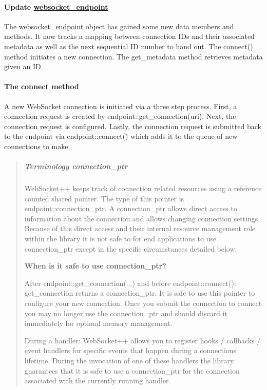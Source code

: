 \paragraph*{Update {\ttfamily \hyperlink{classwebsocket__endpoint}{websocket\+\_\+endpoint}}}

The {\ttfamily \hyperlink{classwebsocket__endpoint}{websocket\+\_\+endpoint}} object has gained some new data members and methods. It now tracks a mapping between connection I\+Ds and their associated metadata as well as the next sequential ID number to hand out. The {\ttfamily connect()} method initiates a new connection. The {\ttfamily get\+\_\+metadata} method retrieves metadata given an ID.

\paragraph*{The connect method}

A new Web\+Socket connection is initiated via a three step process. First, a connection request is created by {\ttfamily endpoint\+::get\+\_\+connection(uri)}. Next, the connection request is configured. Lastly, the connection request is submitted back to the endpoint via {\ttfamily endpoint\+::connect()} which adds it to the queue of new connections to make.

\begin{quote}
\subparagraph*{Terminology {\ttfamily connection\+\_\+ptr}}

Web\+Socket++ keeps track of connection related resources using a reference counted shared pointer. The type of this pointer is {\ttfamily endpoint\+::connection\+\_\+ptr}. A {\ttfamily connection\+\_\+ptr} allows direct access to information about the connection and allows changing connection settings. Because of this direct access and their internal resource management role within the library it is not safe to for end applications to use {\ttfamily connection\+\_\+ptr} except in the specific circumstances detailed below.

{\bfseries When is it safe to use {\ttfamily connection\+\_\+ptr}?}
\begin{DoxyItemize}
\item After {\ttfamily endpoint\+::get\+\_\+connection(...)} and before {\ttfamily endpoint\+::connect()}\+: {\ttfamily get\+\_\+connection} returns a {\ttfamily connection\+\_\+ptr}. It is safe to use this pointer to configure your new connection. Once you submit the connection to {\ttfamily connect} you may no longer use the {\ttfamily connection\+\_\+ptr} and should discard it immediately for optimal memory management.
\item During a handler\+: Web\+Socket++ allows you to register hooks / callbacks / event handlers for specific events that happen during a connection\textquotesingle{}s lifetime. During the invocation of one of these handlers the library guarantees that it is safe to use a {\ttfamily connection\+\_\+ptr} for the connection associated with the currently running handler. 
\end{DoxyItemize}\end{quote}


